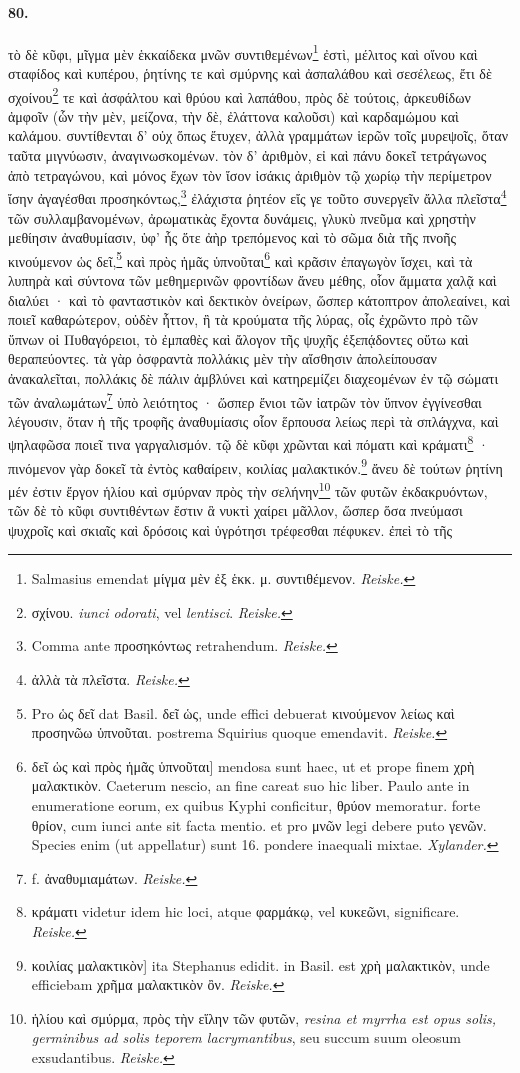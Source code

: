 \documentclass[a4paper, 11pt, oneside, polutonikogreek, german, landscape]{article}
\begin{document}
\paragraph{80.}
τὸ δὲ κῦφι, μῖγμα μὲν ἑκκαίδεκα μνῶν συντιθεμένων\footnote{Salmasius emendat μίγμα μὲν ἐξ ἑκκ. μ. συντιθέμενον. \emph{Reiske.}} ἐστὶ, μέλιτος καὶ οἴνου καὶ σταφίδος καὶ κυπέρου, ῥητίνης τε καὶ σμύρνης καὶ ἀσπαλάθου καὶ σεσέλεως, ἔτι δὲ σχοίνου\footnote{σχίνου. \emph{iunci odorati}, vel \emph{lentisci}. \emph{Reiske.}} τε καὶ ἀσφάλτου καὶ θρύου καὶ λαπάθου, πρὸς δὲ τούτοις, ἀρκευθίδων ἀμφοῖν (ὧν τὴν μὲν, μείζονα, τὴν δὲ, ἐλάττονα καλοῦσι) καὶ καρδαμώμου καὶ καλάμου. συντίθενται δ' οὐχ ὅπως ἔτυχεν, ἀλλὰ γραμμάτων ἱερῶν τοῖς μυρεψοῖς, ὅταν ταῦτα μιγνύωσιν, ἀναγινωσκομένων. τὸν δ' ἀριθμὸν, εἰ καὶ πάνυ δοκεῖ τετράγωνος ἀπὸ τετραγώνου, καὶ μόνος ἔχων τὸν ἴσον ἰσάκις ἀριθμὸν τῷ χωρίῳ τὴν περίμετρον ἴσην ἀγαγέσθαι προσηκόντως,\footnote{Comma ante προσηκόντως retrahendum. \emph{Reiske.}} ἐλάχιστα ῥητέον εἴς γε τοῦτο συνεργεῖν ἄλλα πλεῖστα\footnote{ἀλλὰ τὰ πλεῖστα. \emph{Reiske.}} τῶν συλλαμβανομένων, ἀρωματικὰς ἔχοντα δυνάμεις, γλυκὺ πνεῦμα καὶ χρηστὴν μεθίησιν ἀναθυμίασιν, ὑφ' ἧς ὅτε ἀὴρ τρεπόμενος καὶ τὸ σῶμα διὰ τῆς πνοῆς κινούμενον ὡς δεῖ,\footnote{Pro ὡς δεῖ dat Basil. δεῖ ὡς, unde effici debuerat κινούμενον λείως καὶ προσηνῶω ὑπνοῦται. postrema Squirius quoque emendavit. \emph{Reiske.}} καὶ πρὸς ἡμᾶς ὑπνοῦται\footnote{δεῖ ὡς καὶ πρὸς ἡμᾶς ὑπνοῦται] mendosa sunt haec, ut et prope finem χρὴ μαλακτικὸν. Caeterum nescio, an fine careat suo hic liber. Paulo ante in enumeratione eorum, ex quibus Kyphi conficitur, θρύον memoratur. forte θρίον, cum iunci ante sit facta mentio. et pro μνῶν legi debere puto γενῶν. Species enim (ut appellatur) sunt 16. pondere inaequali mixtae. \emph{Xylander.} } καὶ κρᾶσιν ἐπαγωγὸν ἴσχει, καὶ τὰ λυπηρὰ καὶ σύντονα τῶν μεθημερινῶν φροντίδων ἄνευ μέθης, οἷον ἅμματα χαλᾷ καὶ διαλύει · καὶ τὸ φανταστικὸν καὶ δεκτικὸν ὀνείρων, ὥσπερ κάτοπτρον ἀπολεαίνει, καὶ ποιεῖ καθαρώτερον, οὐδὲν ἧττον, ἢ τὰ κρούματα τῆς λύρας, οἷς ἐχρῶντο πρὸ τῶν ὕπνων οἱ Πυθαγόρειοι, τὸ ἐμπαθὲς καὶ ἄλογον τῆς ψυχῆς ἐξεπᾴδοντες οὕτω καὶ θεραπεύοντες. τὰ γὰρ ὀσφραντὰ πολλάκις μὲν τὴν αἴσθησιν ἀπολείπουσαν ἀνακαλεῖται, πολλάκις δὲ πάλιν ἀμβλύνει καὶ κατηρεμίζει διαχεομένων ἐν τῷ σώματι τῶν ἀναλωμάτων\footnote{f. ἀναθυμιαμάτων. \emph{Reiske.}} ὑπὸ λειότητος · ὥσπερ ἔνιοι τῶν ἰατρῶν τὸν ὕπνον ἐγγίνεσθαι λέγουσιν, ὅταν ἡ τῆς τροφῆς ἀναθυμίασις οἷον ἕρπουσα λείως περὶ τὰ σπλάγχνα, καὶ ψηλαφῶσα ποιεῖ τινα γαργαλισμόν. τῷ δὲ κῦφι χρῶνται καὶ πόματι καὶ κράματι\footnote{κράματι videtur idem hic loci, atque φαρμάκῳ, vel κυκεῶνι, significare. \emph{Reiske.}} · πινόμενον γὰρ δοκεῖ τὰ ἐντὸς καθαίρειν, κοιλίας μαλακτικόν.\footnote{κοιλίας μαλακτικὸν] ita Stephanus edidit. in Basil. est χρὴ μαλακτικὸν, unde efficiebam χρῆμα μαλακτικὸν ὂν. \emph{Reiske.}} ἄνευ δὲ τούτων ῥητίνη μέν ἐστιν ἔργον ἡλίου καὶ σμύρναν πρὸς τὴν σελήνην\footnote{ἡλίου καὶ σμύρμα, πρὸς τὴν εἵλην τῶν φυτῶν, \emph{resina et myrrha est opus solis, germinibus ad solis teporem lacrymantibus}, seu succum suum oleosum exsudantibus. \emph{Reiske.}} τῶν φυτῶν ἐκδακρυόντων, τῶν δὲ τὸ κῦφι συντιθέντων ἔστιν ἃ νυκτὶ χαίρει μᾶλλον, ὥσπερ ὅσα πνεύμασι ψυχροῖς καὶ σκιαῖς καὶ δρόσοις καὶ ὑγρότησι τρέφεσθαι πέφυκεν. ἐπεὶ τὸ τῆς 
\end{document}
